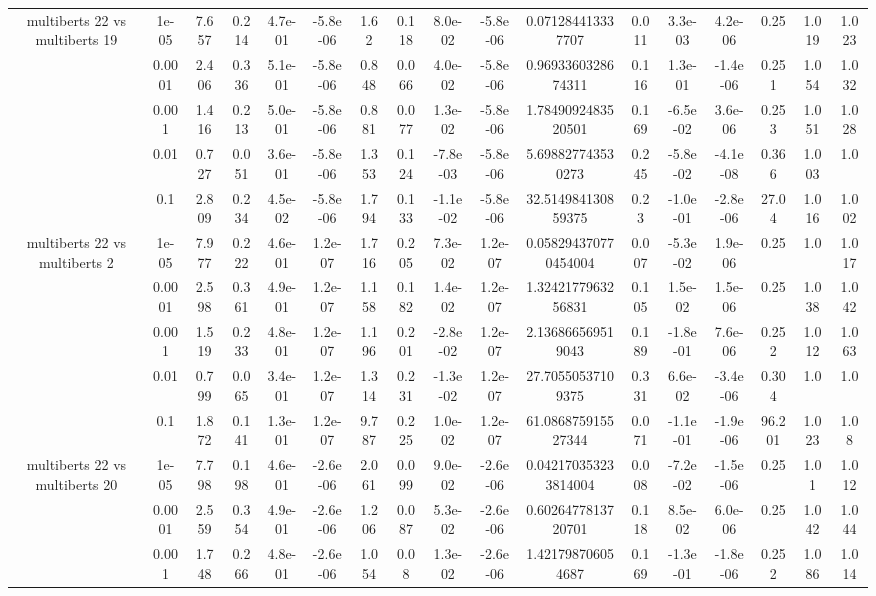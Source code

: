 \begin{tabular}{|c|c|c|c|c|c|c|c|c|c|c|c|c|c|c|c|c|}
\hline
\multirow{5}{*}{multiberts 22 vs multiberts 19} & 1e-05 & 7.657 & 0.214 & 4.7e-01 & -5.8e-06 & 1.62 & 0.118 & 8.0e-02 & -5.8e-06 & 0.071284413337707 & 0.011 & 3.3e-03 & 4.2e-06 & 0.25 & 1.019 & 1.023 \\
 & 0.0001 & 2.406 & 0.336 & 5.1e-01 & -5.8e-06 & 0.848 & 0.066 & 4.0e-02 & -5.8e-06 & 0.9693360328674311 & 0.116 & 1.3e-01 & -1.4e-06 & 0.251 & 1.054 & 1.032 \\
 & 0.001 & 1.416 & 0.213 & 5.0e-01 & -5.8e-06 & 0.881 & 0.077 & 1.3e-02 & -5.8e-06 & 1.7849092483520501 & 0.169 & -6.5e-02 & 3.6e-06 & 0.253 & 1.051 & 1.028 \\
 & 0.01 & 0.727 & 0.051 & 3.6e-01 & -5.8e-06 & 1.353 & 0.124 & -7.8e-03 & -5.8e-06 & 5.698827743530273 & 0.245 & -5.8e-02 & -4.1e-08 & 0.366 & 1.003 & 1.0 \\
 & 0.1 & 2.809 & 0.234 & 4.5e-02 & -5.8e-06 & 1.794 & 0.133 & -1.1e-02 & -5.8e-06 & 32.514984130859375 & 0.23 & -1.0e-01 & -2.8e-06 & 27.04 & 1.016 & 1.002 \\
\hline
\multirow{5}{*}{multiberts 22 vs multiberts 2} & 1e-05 & 7.977 & 0.222 & 4.6e-01 & 1.2e-07 & 1.716 & 0.205 & 7.3e-02 & 1.2e-07 & 0.058294370770454004 & 0.007 & -5.3e-02 & 1.9e-06 & 0.25 & 1.0 & 1.017 \\
 & 0.0001 & 2.598 & 0.361 & 4.9e-01 & 1.2e-07 & 1.158 & 0.182 & 1.4e-02 & 1.2e-07 & 1.3242177963256831 & 0.105 & 1.5e-02 & 1.5e-06 & 0.25 & 1.038 & 1.042 \\
 & 0.001 & 1.519 & 0.233 & 4.8e-01 & 1.2e-07 & 1.196 & 0.201 & -2.8e-02 & 1.2e-07 & 2.136866569519043 & 0.189 & -1.8e-01 & 7.6e-06 & 0.252 & 1.012 & 1.063 \\
 & 0.01 & 0.799 & 0.065 & 3.4e-01 & 1.2e-07 & 1.314 & 0.231 & -1.3e-02 & 1.2e-07 & 27.70550537109375 & 0.331 & 6.6e-02 & -3.4e-06 & 0.304 & 1.0 & 1.0 \\
 & 0.1 & 1.872 & 0.141 & 1.3e-01 & 1.2e-07 & 9.787 & 0.225 & 1.0e-02 & 1.2e-07 & 61.086875915527344 & 0.071 & -1.1e-01 & -1.9e-06 & 96.201 & 1.023 & 1.08 \\
\hline
\multirow{5}{*}{multiberts 22 vs multiberts 20} & 1e-05 & 7.798 & 0.198 & 4.6e-01 & -2.6e-06 & 2.061 & 0.099 & 9.0e-02 & -2.6e-06 & 0.042170353233814004 & 0.008 & -7.2e-02 & -1.5e-06 & 0.25 & 1.01 & 1.012 \\
 & 0.0001 & 2.559 & 0.354 & 4.9e-01 & -2.6e-06 & 1.206 & 0.087 & 5.3e-02 & -2.6e-06 & 0.6026477813720701 & 0.118 & 8.5e-02 & 6.0e-06 & 0.25 & 1.042 & 1.044 \\
 & 0.001 & 1.748 & 0.266 & 4.8e-01 & -2.6e-06 & 1.054 & 0.08 & 1.3e-02 & -2.6e-06 & 1.421798706054687 & 0.169 & -1.3e-01 & -1.8e-06 & 0.252 & 1.086 & 1.014 \\

\end{tabular}
